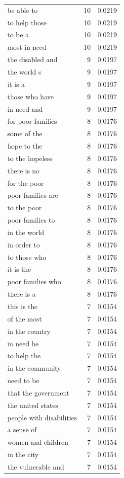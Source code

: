 \begin{tabular}{lrl}
be able to & 10 & 0.0219 \\
to help those & 10 & 0.0219 \\
to be a & 10 & 0.0219 \\
most in need & 10 & 0.0219 \\
the disabled and & 9 & 0.0197 \\
the world s & 9 & 0.0197 \\
it is a & 9 & 0.0197 \\
those who have & 9 & 0.0197 \\
in need and & 9 & 0.0197 \\
for poor families & 8 & 0.0176 \\
some of the & 8 & 0.0176 \\
hope to the & 8 & 0.0176 \\
to the hopeless & 8 & 0.0176 \\
there is no & 8 & 0.0176 \\
for the poor & 8 & 0.0176 \\
poor families are & 8 & 0.0176 \\
to the poor & 8 & 0.0176 \\
poor families to & 8 & 0.0176 \\
in the world & 8 & 0.0176 \\
in order to & 8 & 0.0176 \\
to those who & 8 & 0.0176 \\
it is the & 8 & 0.0176 \\
poor families who & 8 & 0.0176 \\
there is a & 8 & 0.0176 \\
this is the & 7 & 0.0154 \\
of the most & 7 & 0.0154 \\
in the country & 7 & 0.0154 \\
in need he & 7 & 0.0154 \\
to help the & 7 & 0.0154 \\
in the community & 7 & 0.0154 \\
need to be & 7 & 0.0154 \\
that the government & 7 & 0.0154 \\
the united states & 7 & 0.0154 \\
people with disabilities & 7 & 0.0154 \\
a sense of & 7 & 0.0154 \\
women and children & 7 & 0.0154 \\
in the city & 7 & 0.0154 \\
the vulnerable and & 7 & 0.0154 \\

\end{tabular}
